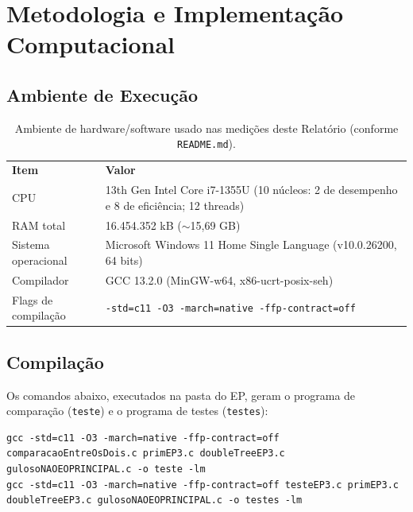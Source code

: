 \documentclass[11pt,a4paper]{article}
\newcommand{\cab}[1]{\leavevmode\color{white}\bfseries #1}
\newcommand{\fioCabecalho}{\arrayrulecolor{tabFio}\specialrule{1.2pt}{0pt}{0pt}\arrayrulecolor{eachTeal}}
\renewcommand{\_}{\underscoreoriginal\allowbreak}
\begin{document}
\section{Metodologia e Implementação Computacional}

\subsection{Ambiente de Execução}
\label{sec:ambiente}

\begin{table}[H]
\centering
\caption{Ambiente de hardware/software usado nas medições deste Relatório (conforme \texttt{README.md}).}
\label{tab:ambiente}
{\small
{}
\begin{tabular}{L{4.0cm} L{10.5cm}}
\toprule
{}
\cab{Item} & \cab{Valor}\\
\fioCabecalho
CPU & 13th Gen Intel Core i7-1355U (10 núcleos: 2 de desempenho e 8 de eficiência; 12 threads)\\
RAM total & 16.454.352 kB ($\sim$15,69 GB)\\
Sistema operacional & Microsoft Windows 11 Home Single Language (v10.0.26200, 64 bits)\\
Compilador & GCC 13.2.0 (MinGW-w64, x86\_64-ucrt-posix-seh)\\
Flags de compilação & \texttt{-std=c11 -O3 -march=native -ffp-contract=off}\\
\bottomrule
\end{tabular}
}
\end{table}

\subsection{Compilação}

Os comandos abaixo, executados na pasta do EP, geram o programa de
comparação (\texttt{teste}) e o programa de testes (\texttt{testes}):

\begin{lstlisting}
gcc -std=c11 -O3 -march=native -ffp-contract=off comparacaoEntreOsDois.c primEP3.c doubleTreeEP3.c gulosoNAOEOPRINCIPAL.c -o teste -lm
gcc -std=c11 -O3 -march=native -ffp-contract=off testeEP3.c primEP3.c doubleTreeEP3.c gulosoNAOEOPRINCIPAL.c -o testes -lm
\end{lstlisting}
\end{document}
